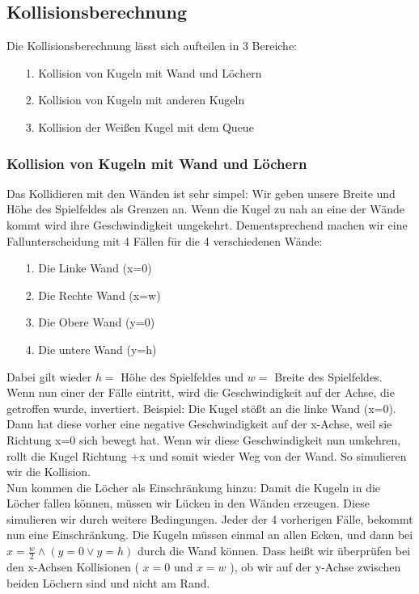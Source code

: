 \subsection{Kollisionsberechnung}
	Die Kollisionsberechnung lässt sich aufteilen in 3 Bereiche: \begin{itemize}
		\item [1.] Kollision von Kugeln mit Wand und Löchern
		\item [2.] Kollision von Kugeln mit anderen Kugeln
		\item [3.] Kollision der Weißen Kugel mit dem Queue
	\end{itemize}
	\subsubsection{Kollision von Kugeln mit Wand und Löchern}
		Das Kollidieren mit den Wänden ist sehr simpel: Wir geben  unsere Breite und Höhe des Spielfeldes als Grenzen an. Wenn die Kugel zu nah an eine der Wände kommt wird ihre Geschwindigkeit umgekehrt. Dementsprechend machen wir eine Fallunterscheidung mit 4 Fällen für die 4 verschiedenen Wände: \begin{itemize}
			\item [1.] Die Linke Wand (x=0)
			\item [2.] Die Rechte Wand (x=w)
			\item [3.] Die Obere Wand (y=0)
			\item [4.] Die untere Wand (y=h)
		\end{itemize}
		Dabei gilt wieder $ h = $ Höhe des Spielfeldes und $ w = $ Breite des Spielfeldes. \\
		Wenn nun einer der Fälle eintritt, wird die Geschwindigkeit auf der Achse, die getroffen wurde, invertiert. Beispiel: Die Kugel stößt an die linke Wand (x=0). Dann hat diese vorher eine negative Geschwindigkeit auf der x-Achse, weil sie Richtung x=0 sich bewegt hat. Wenn wir diese Geschwindigkeit nun umkehren, rollt die Kugel Richtung +x und somit wieder Weg von der Wand. So simulieren wir die Kollision. \\
		Nun kommen die Löcher als Einschränkung hinzu: Damit die Kugeln in die Löcher fallen können, müssen wir Lücken in den Wänden erzeugen. 
		Diese simulieren wir durch weitere Bedingungen. Jeder der 4 vorherigen Fälle, bekommt nun eine  Einschränkung. 
		Die Kugeln müssen einmal an allen Ecken, und dann bei $x= \frac{w}{2}\land (y= 0 \lor y = h)$ durch die Wand können. 
		Dass heißt wir überprüfen bei den x-Achsen Kollisionen ( $x=0$ und $x=w$ ), ob wir auf der y-Achse zwischen beiden Löchern sind und nicht am Rand. 

